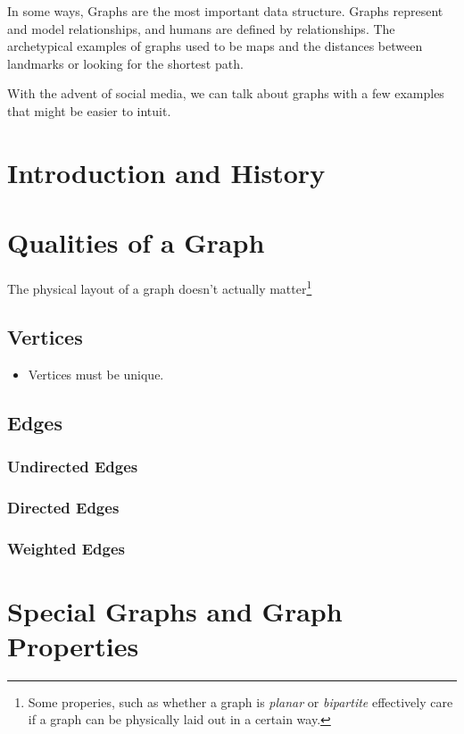 \documentclass[10pt,a4paper]{book}
\begin{document}
In some ways, Graphs are the most important data structure.  
Graphs represent and model relationships, and humans are defined by relationships.
The archetypical examples of graphs used to be maps and the distances between landmarks or looking for the shortest path.

With the advent of social media, we can talk about graphs with a few examples that might be easier to intuit.

\section{Introduction and History}


\section{Qualities of a Graph}

The physical layout of a graph doesn't actually matter\footnote{Some properies, such as whether a graph is \emph{planar} or \emph{bipartite} effectively care if a graph can be physically laid out in a certain way.}

\subsection{Vertices}

\begin{itemize}
	\item Vertices must be unique.
\end{itemize}

\subsection{Edges}

\subsubsection{Undirected Edges}

\subsubsection{Directed Edges}

\subsubsection{Weighted Edges}


\section{Special Graphs and Graph Properties}
\end{document}
